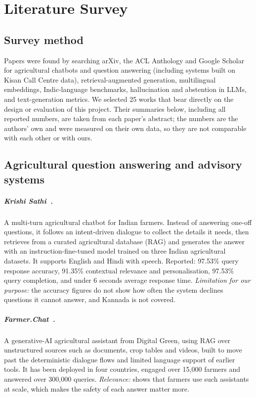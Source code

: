 \chapter{Literature Survey}
\label{ch:literature}

\section{Survey method}
Papers were found by searching arXiv, the ACL Anthology and Google Scholar for
agricultural chatbots and question answering (including systems built on Kisan Call Centre
data), retrieval-augmented generation, multilingual embeddings, Indic-language benchmarks,
hallucination and abstention in LLMs, and text-generation metrics. We selected 25 works that
bear directly on the design or evaluation of this project. Their summaries below, including
all reported numbers, are taken from each paper's abstract; the numbers are the authors'
own and were measured on their own data, so they are not comparable with each other or with
ours.

\section{Agricultural question answering and advisory systems}

\paragraph{Krishi Sathi~\cite{vijayvargia2025krishisathi}.}
A multi-turn agricultural chatbot for Indian farmers. Instead of answering one-off
questions, it follows an intent-driven dialogue to collect the details it needs, then
retrieves from a curated agricultural database (RAG) and generates the answer with an
instruction-fine-tuned model trained on three Indian agricultural datasets. It supports
English and Hindi with speech. Reported: 97.53\% query response accuracy, 91.35\%
contextual relevance and personalisation, 97.53\% query completion, and under 6 seconds
average response time. \emph{Limitation for our purpose:} the accuracy figures do not show
how often the system declines questions it cannot answer, and Kannada is not covered.

\paragraph{Farmer.Chat~\cite{singh2024farmerchat}.}
A generative-AI agricultural assistant from Digital Green, using RAG over unstructured
sources such as documents, crop tables and videos, built to move past the deterministic
dialogue flows and limited language support of earlier tools. It has been deployed in four
countries, engaged over 15,000 farmers and answered over 300,000 queries. \emph{Relevance:}
shows that farmers use such assistants at scale, which makes the safety of each answer
matter more.

